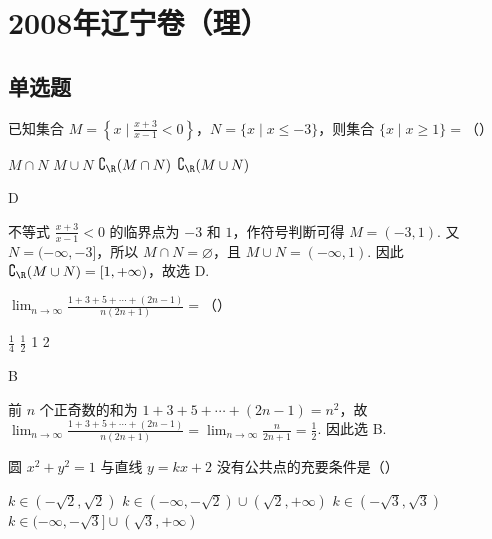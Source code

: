 \chapter{2008年辽宁卷（理）}

\section{单选题}

\begin{problem}
已知集合 \(M = \left\{x \mid \frac{x + 3}{x - 1} < 0\right\}\)，\(N = \{x \mid x \leqslant -3\}\)，则集合 \(\{x \mid x \geqslant 1\} =\)（\quad）

\choices
    {\(M \cap N\)}
    {\(M \cup N\)}
    {\(\complement_{\R}(M\cap N)\)}
    {\(\complement_{\R}(M \cup N)\)}
\end{problem}

\begin{answer}
D
\end{answer}

\begin{solution}
不等式 \(\frac{x+3}{x-1}<0\) 的临界点为 \(-3\) 和 \(1\)，作符号判断可得 \(M=(-3,1)\). 又 \(N=(-\infty,-3]\)，所以 \(M\cap N=\varnothing\)，且 \(M\cup N=(-\infty,1)\). 因此
\(\complement_{\R}(M\cup N)=[1,+\infty)\)，故选 D.
\end{solution}

\begin{problem}
\(\displaystyle\lim_{n\to \infty}\frac{1 + 3 + 5 + \cdots + (2n - 1)}{n(2n + 1)} =\)（\quad）

\choices
    {\(\frac{1}{4}\)}
    {\(\frac{1}{2}\)}
    {1}
    {2}
\end{problem}

\begin{answer}
B
\end{answer}

\begin{solution}
前 \(n\) 个正奇数的和为 \(1+3+5+\cdots+(2n-1)=n^2\)，故
\(\displaystyle\lim_{n\to\infty}\frac{1+3+5+\cdots+(2n-1)}{n(2n+1)}=\lim_{n\to\infty}\frac{n}{2n+1}=\frac{1}{2}\). 因此选 B.
\end{solution}

\begin{problem}
圆 \(x^{2} + y^{2} = 1\) 与直线 \(y = kx + 2\) 没有公共点的充要条件是（\quad）

\choices
    {\(k \in (-\sqrt{2}, \sqrt{2})\)}
    {\(k \in (-\infty, -\sqrt{2}) \cup (\sqrt{2}, +\infty)\)}
    {\(k \in (-\sqrt{3}, \sqrt{3})\)}
    {\(k \in (-\infty, -\sqrt{3}] \cup (\sqrt{3}, +\infty)\)}
\end{problem}

